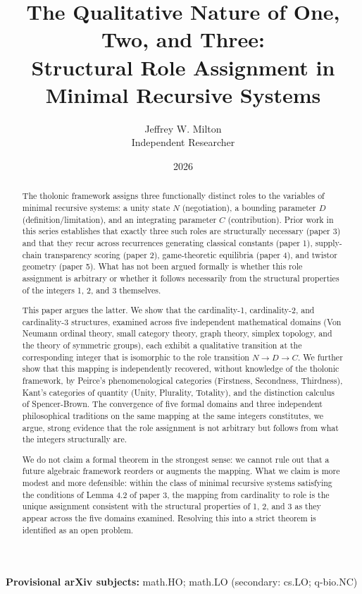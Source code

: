 \documentclass[12pt]{article}
\title{The Qualitative Nature of One, Two, and Three:\\
\large Structural Role Assignment in Minimal Recursive Systems}
\author{Jeffrey W. Milton\\[4pt]\small Independent Researcher}
\date{2026}
\begin{document}
\maketitle

\noindent\textbf{Provisional arXiv subjects:} math.HO; math.LO (secondary: cs.LO; q-bio.NC)

\begin{abstract}
The tholonic framework assigns three functionally distinct roles to the
variables of minimal recursive systems: a unity state \(N\)
(negotiation), a bounding parameter \(D\) (definition/limitation), and
an integrating parameter \(C\) (contribution). Prior work in this series
establishes that exactly three such roles are structurally necessary
(paper 3) and that they recur across recurrences generating classical
constants (paper 1), supply-chain transparency scoring (paper 2),
game-theoretic equilibria (paper 4), and twistor geometry (paper 5).
What has not been argued formally is whether this role assignment is
arbitrary or whether it follows necessarily from the structural
properties of the integers 1, 2, and 3 themselves.

This paper argues the latter. We show that the cardinality-1,
cardinality-2, and cardinality-3 structures, examined across five
independent mathematical domains (Von Neumann ordinal theory, small
category theory, graph theory, simplex topology, and the theory of
symmetric groups), each exhibit a qualitative transition at the
corresponding integer that is isomorphic to the role transition
\(N \to D \to C\). We further show that this mapping is independently
recovered, without knowledge of the tholonic framework, by Peirce's
phenomenological categories (Firstness, Secondness, Thirdness), Kant's
categories of quantity (Unity, Plurality, Totality), and the distinction
calculus of Spencer-Brown. The convergence of five formal domains and
three independent philosophical traditions on the same mapping at the
same integers constitutes, we argue, strong evidence that the role
assignment is not arbitrary but follows from what the integers
structurally are.

We do not claim a formal theorem in the strongest sense: we cannot rule
out that a future algebraic framework reorders or augments the mapping.
What we claim is more modest and more defensible: within the class of
minimal recursive systems satisfying the conditions of Lemma 4.2 of
paper 3, the mapping from cardinality to role is the unique assignment
consistent with the structural properties of 1, 2, and 3 as they appear
across the five domains examined. Resolving this into a strict theorem
is identified as an open problem.
\end{abstract}
\end{document}
